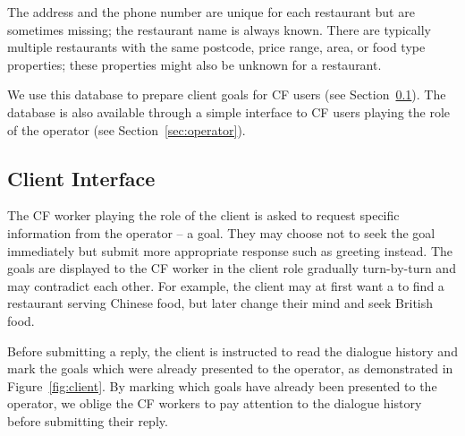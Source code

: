 \documentclass[runningheads,a4paper]{llncs}
\def\OD#1{{\color{darkgreen}OD: \it #1}}
\begin{document}
The address and the phone number are unique for each restaurant but are sometimes missing; the restaurant name is always known. 
There are typically multiple restaurants with the same postcode, price range, area, or food type properties; these properties might also be unknown for a restaurant.

We use this database to prepare client goals for CF users (see Section~\ref{sec:client}).
The database is also available through a simple interface to CF users playing the role of the operator (see Section~\ref{sec:operator}).

\vspace{-1.00em}
\subsection{Client Interface}
\label{sec:client}

The CF worker playing the role of the client is asked to request specific information from the operator – a goal.
They may choose not to seek the goal immediately but submit more appropriate response such as greeting instead.
The goals are displayed to the CF worker in the client role gradually turn-by-turn and may contradict each other.
For example, the client may at first want a to find a restaurant serving Chinese food, but later change their mind and seek British food.

Before submitting a reply, the client is instructed to read the dialogue history and mark the goals which were already presented to the operator, as demonstrated in Figure~\ref{fig:client}.
By marking which goals have already been presented to the operator, we oblige the CF workers to pay attention to the dialogue history before submitting their reply.
\end{document}

